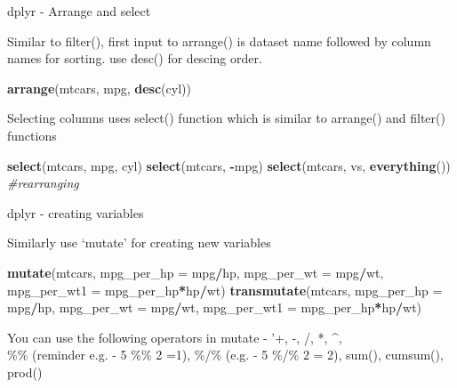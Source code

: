 \documentclass[ignorenonframetext,]{beamer}
\newenvironment{Shaded}{\begin{snugshade}}{\end{snugshade}}
\newcommand{\CommentTok}[1]{\textcolor[rgb]{0.56,0.35,0.01}{\textit{#1}}}
\newcommand{\DataTypeTok}[1]{\textcolor[rgb]{0.13,0.29,0.53}{#1}}
\newcommand{\KeywordTok}[1]{\textcolor[rgb]{0.13,0.29,0.53}{\textbf{#1}}}
\newcommand{\NormalTok}[1]{#1}
\newcommand{\OperatorTok}[1]{\textcolor[rgb]{0.81,0.36,0.00}{\textbf{#1}}}
\begin{document}
\begin{frame}[fragile]{dplyr - Arrange and select}
\protect\hypertarget{dplyr---arrange-and-select}{}

Similar to filter(), first input to arrange() is dataset name followed
by column names for sorting. use desc() for descing order.

\begin{Shaded}
\begin{Highlighting}[]
\KeywordTok{arrange}\NormalTok{(mtcars, mpg, }\KeywordTok{desc}\NormalTok{(cyl))}
\end{Highlighting}
\end{Shaded}

Selecting columns uses select() function which is similar to arrange()
and filter() functions

\begin{Shaded}
\begin{Highlighting}[]
\KeywordTok{select}\NormalTok{(mtcars, mpg, cyl)}
\KeywordTok{select}\NormalTok{(mtcars, }\OperatorTok{-}\NormalTok{mpg)}
\KeywordTok{select}\NormalTok{(mtcars, vs, }\KeywordTok{everything}\NormalTok{()) }\CommentTok{#rearranging}
\end{Highlighting}
\end{Shaded}

\end{frame}

\begin{frame}[fragile]{dplyr - creating variables}
\protect\hypertarget{dplyr---creating-variables}{}

Similarly use `mutate' for creating new variables

\begin{Shaded}
\begin{Highlighting}[]
\KeywordTok{mutate}\NormalTok{(mtcars, }\DataTypeTok{mpg_per_hp =}\NormalTok{ mpg}\OperatorTok{/}\NormalTok{hp, }\DataTypeTok{mpg_per_wt =}\NormalTok{ mpg}\OperatorTok{/}\NormalTok{wt, }
       \DataTypeTok{mpg_per_wt1 =}\NormalTok{ mpg_per_hp}\OperatorTok{*}\NormalTok{hp}\OperatorTok{/}\NormalTok{wt)}
\KeywordTok{transmutate}\NormalTok{(mtcars, }\DataTypeTok{mpg_per_hp =}\NormalTok{ mpg}\OperatorTok{/}\NormalTok{hp, }\DataTypeTok{mpg_per_wt =}\NormalTok{ mpg}\OperatorTok{/}\NormalTok{wt, }
       \DataTypeTok{mpg_per_wt1 =}\NormalTok{ mpg_per_hp}\OperatorTok{*}\NormalTok{hp}\OperatorTok{/}\NormalTok{wt)}
\end{Highlighting}
\end{Shaded}

You can use the following operators in mutate - '+, -, /, *, \^{},\\
\%\% (reminder e.g. - 5 \%\% 2 =1), \%/\% (e.g. - 5 \%/\% 2 = 2), sum(),
cumsum(), prod()

\end{frame}
\end{document}
